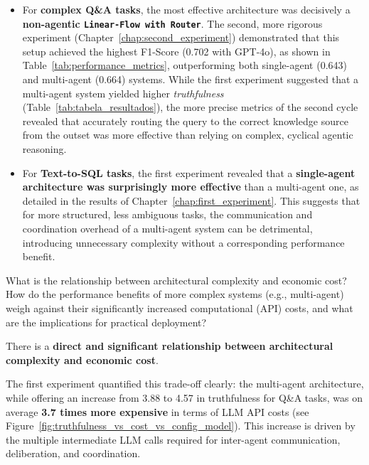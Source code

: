     \begin{itemize}
        \item For \textbf{complex Q\&A tasks}, the most effective architecture was decisively a \textbf{non-agentic \texttt{Linear-Flow with Router}}. The second, more rigorous experiment  (Chapter~\ref{chap:second_experiment}) demonstrated that this setup achieved the highest F1-Score (0.702 with GPT-4o), as shown in Table~\ref{tab:performance_metrics}, outperforming both single-agent (0.643) and multi-agent (0.664) systems. While the first experiment suggested that a multi-agent system yielded higher \textit{truthfulness} (Table~\ref{tab:tabela_resultados}), the more precise metrics of the second cycle revealed that accurately routing the query to the correct knowledge source from the outset was more effective than relying on complex, cyclical agentic reasoning.

        \item For \textbf{Text-to-SQL tasks}, the first experiment revealed that a \textbf{single-agent architecture was surprisingly more effective} than a multi-agent one, as detailed in the results of Chapter~\ref{chap:first_experiment}. This suggests that for more structured, less ambiguous tasks, the communication and coordination overhead of a multi-agent system can be detrimental, introducing unnecessary complexity without a corresponding performance benefit.
    \end{itemize}

    \vspace{\baselineskip}
    \begin{tcolorbox}[colback=gray!10, colframe=gray!40, title=\textbf{RQ2: Cost-Effectiveness}]
    What is the relationship between architectural complexity and economic cost? How do the performance benefits of more complex systems (e.g., multi-agent) weigh against their significantly increased computational (API) costs, and what are the implications for practical deployment?
    \end{tcolorbox}
    \vspace{\baselineskip}

    There is a \textbf{direct and significant relationship between architectural complexity and economic cost}.

    The first experiment quantified this trade-off clearly: the multi-agent architecture, while offering an increase from 3.88 to 4.57 in truthfulness for Q\&A tasks, was on average \textbf{3.7 times more expensive} in terms of LLM API costs (see Figure~\ref{fig:truthfulness_vs_cost_vs_config_model}). This increase is driven by the multiple intermediate LLM calls required for inter-agent communication, deliberation, and coordination.

